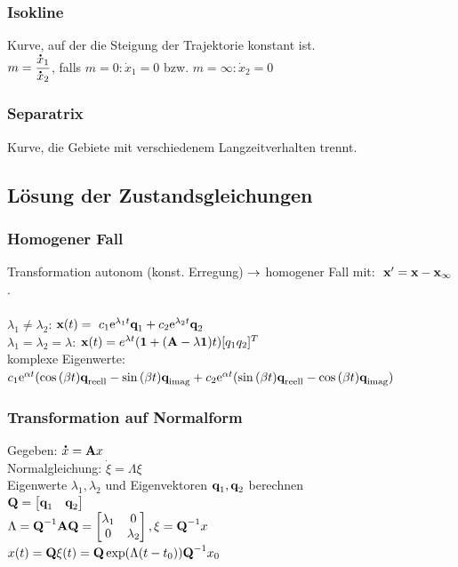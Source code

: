 \documentclass[fs, footer]{latex4ei}
\begin{document}
\begin{multicols*}{4}
    \subsubsection{Isokline}
    Kurve, auf der die Steigung der Trajektorie konstant ist.\\
    $m = \dfrac {\accentset{\mbox{\textrm{\large\bfseries .}} }{x}_1}{\accentset{\mbox{\textrm{\large\bfseries .}} }{x}_2}$, falls $m = 0: \dot x_1 = 0$ bzw. $m = \infty: \dot x_2 = 0$
    \subsubsection{Separatrix}
    Kurve, die Gebiete mit verschiedenem Langzeitverhalten trennt.
    \subsection{Lösung der Zustandsgleichungen}
    \subsubsection{Homogener Fall}
    Transformation autonom (konst. Erregung) $\rightarrow$ homogener Fall mit: $\ \textbf{x}' = \textbf{x} - \textbf{x}_\infty$.\\ \\
    $\lambda_1 \neq \lambda_2$: $\textbf{x}(t) = \ c_1\mathrm{e}^{\lambda_1t}\textbf{q}_1 + c_2\mathrm{e}^{\lambda_2t}\textbf{q}_2$\\
    $\lambda_1 = \lambda_2 = \lambda$: $\textbf{x}(t) = e^{\lambda t}(\textbf{1} + (\textbf{A} -\lambda \textbf{1})t) [q_1 q_2]^T$\\
    komplexe Eigenwerte: $c_1 \mathrm{e}^{\alpha t}(\cos{(\beta t)}\textbf{q}_{\text{reell}} - \sin{(\beta t)}\textbf{q}_{\text{imag}} + c_2\mathrm{e}^{\alpha t}(\sin{(\beta t)}\textbf{q}_{\text{reell}} - \cos{(\beta t)}\textbf{q}_{\text{imag}})$\\
    \subsubsection{Transformation auf Normalform}
    Gegeben: $\accentset{\mbox{\textrm{\large\bfseries .}} }{x} = \textbf{A} x$\\
    Normalgleichung: $\dot{\xi} = \Lambda{}\xi$\\
    Eigenwerte $\lambda_1, \lambda_2$ und Eigenvektoren $\textbf{q}_1, \textbf{q}_2$ berechnen\\
    $\textbf{Q} =  \begin{bmatrix} \textbf{q}_1 & \textbf{q}_2  \end{bmatrix}$\\
    $\Lambda = \textbf{Q}^{-1}\textbf{A}\textbf{Q} = \begin{bmatrix} \lambda_1 & 0 \\ 0 & \lambda_2  \end{bmatrix}, \xi = \textbf{Q}^{-1} x$\\
    $x(t) = \textbf{Q} \xi(t) = \textbf{Q} \exp(\Lambda(t-t_0))\textbf{Q}^{-1} x_0$\\

\end{multicols*}
\end{document}
